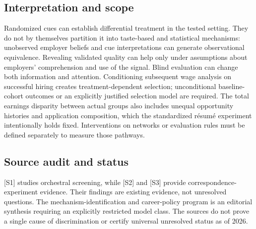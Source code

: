 \documentclass[11pt,a4paper]{article}
\begin{document}
\subsection*{Interpretation and scope}
Randomized cues can establish differential treatment in the tested setting. They do not by themselves partition it into taste-based and statistical mechanisms: unobserved employer beliefs and cue interpretations can generate observational equivalence. Revealing validated quality can help only under assumptions about employers' comprehension and use of the signal. Blind evaluation can change both information and attention. Conditioning subsequent wage analysis on successful hiring creates treatment-dependent selection; unconditional baseline-cohort outcomes or an explicitly justified selection model are required. The total earnings disparity between actual groups also includes unequal opportunity histories and application composition, which the standardized résumé experiment intentionally holds fixed. Interventions on networks or evaluation rules must be defined separately to measure those pathways.
\subsection*{Source audit and status}
[S1] studies orchestral screening, while [S2] and [S3] provide correspondence-experiment evidence. Their findings are existing evidence, not unresolved questions. The mechanism-identification and career-policy program is an editorial synthesis requiring an explicitly restricted model class. The sources do not prove a single cause of discrimination or certify universal unresolved status as of 2026.
\end{document}

